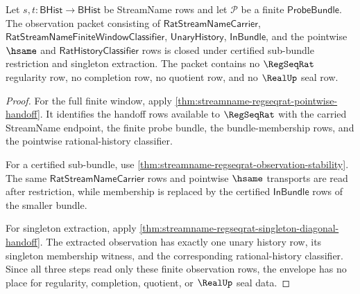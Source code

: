 \begin{theorem}
\label{thm:streamname-regseqrat-observation-envelope}
Let $s,t:\mathsf{BHist}\to\mathsf{BHist}$ be StreamName rows and let
$\mathcal P$ be a finite $\mathsf{ProbeBundle}$. The observation packet
consisting of $\mathsf{RatStreamNameCarrier}$,
$\mathsf{RatStreamNameFiniteWindowClassifier}$, $\mathsf{UnaryHistory}$,
$\mathsf{InBundle}$, and the pointwise $\hsame$ and
$\mathsf{RatHistoryClassifier}$ rows is closed under certified sub-bundle
restriction and singleton extraction. The packet contains no $\RegSeqRat$
regularity row, no completion row, no quotient row, and no $\RealUp$ seal row.
\end{theorem}
\begin{proof}
For the full finite window, apply
\autoref{thm:streamname-regseqrat-pointwise-handoff}. It identifies the
handoff rows available to $\RegSeqRat$ with the carried StreamName endpoint,
the finite probe bundle, the bundle-membership rows, and the pointwise
rational-history classifier.

For a certified sub-bundle, use
\autoref{thm:streamname-regseqrat-observation-stability}. The same
$\mathsf{RatStreamNameCarrier}$ rows and pointwise $\hsame$ transports are
read after restriction, while membership is replaced by the certified
$\mathsf{InBundle}$ rows of the smaller bundle.

For singleton extraction, apply
\autoref{thm:streamname-regseqrat-singleton-diagonal-handoff}. The extracted
observation has exactly one unary history row, its singleton membership
witness, and the corresponding rational-history classifier. Since all three
steps read only these finite observation rows, the envelope has no place for
regularity, completion, quotient, or $\RealUp$ seal data.
\end{proof}


